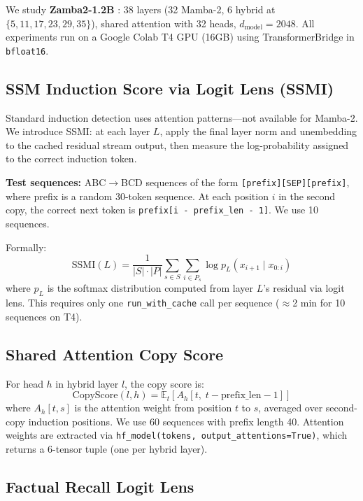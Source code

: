 \documentclass[11pt,a4paper]{article}
\begin{document}
We study \textbf{Zamba2-1.2B} \citep{zyphra2024zamba2}: 38 layers (32 Mamba-2, 6 hybrid at $\{5, 11, 17, 23, 29, 35\}$), shared attention with 32 heads, $d_\text{model}=2048$. All experiments run on a Google Colab T4 GPU (16GB) using TransformerBridge in \texttt{bfloat16}.

\subsection{SSM Induction Score via Logit Lens (SSMI)}

Standard induction detection uses attention patterns---not available for Mamba-2. We introduce SSMI: at each layer $L$, apply the final layer norm and unembedding to the cached residual stream output, then measure the log-probability assigned to the correct induction token.

\textbf{Test sequences:} ABC$\to$BCD sequences of the form \texttt{[prefix][SEP][prefix]}, where prefix is a random 30-token sequence. At each position $i$ in the second copy, the correct next token is \texttt{prefix[i - prefix\_len - 1]}. We use 10 sequences.

Formally:
\begin{equation}
  \text{SSMI}(L) = \frac{1}{|S| \cdot |P|} \sum_{s \in S} \sum_{i \in P_s} \log p_L(x_{i+1} \mid x_{0:i})
\end{equation}
where $p_L$ is the softmax distribution computed from layer $L$'s residual via logit lens. This requires only one \texttt{run\_with\_cache} call per sequence ($\approx$2 min for 10 sequences on T4).

\subsection{Shared Attention Copy Score}

For head $h$ in hybrid layer $l$, the copy score is:
\begin{equation}
  \text{CopyScore}(l, h) = \mathbb{E}_t\!\left[A_h[t,\; t - \text{prefix\_len} - 1]\right]
\end{equation}
where $A_h[t,s]$ is the attention weight from position $t$ to $s$, averaged over second-copy induction positions. We use 60 sequences with prefix length 40. Attention weights are extracted via \texttt{hf\_model(tokens, output\_attentions=True)}, which returns a 6-tensor tuple (one per hybrid layer).

\subsection{Factual Recall Logit Lens}
\end{document}
